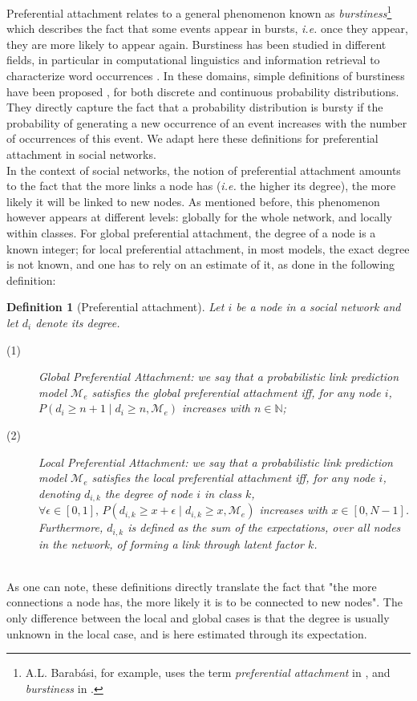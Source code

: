 \documentclass[journal]{IEEEtran}
\newcommand{\pr}{P}
\newtheorem{definition}{Definition}[section]
\begin{document}
Preferential attachment relates to a general phenomenon known as \textit{burstiness}\footnote{A.L. Barab\'asi, for example, uses the term \textit{preferential attachment} in \cite{barabasi1999emergence}, and \textit{burstiness} in \cite{barabasi_burst}.} which describes the fact that some events appear in bursts, \textit{i.e.} once they appear, they are more likely to appear again. Burstiness has been studied in different fields, in particular in computational linguistics and information retrieval to characterize word occurrences \cite{church1995poisson}. In these domains, simple definitions of burstiness have been proposed \cite{clinchant2008bnb,clinchant2010information}, for both discrete and continuous probability distributions. They directly capture the fact that a probability distribution is bursty if the probability of generating a new occurrence of an event increases with the number of occurrences of this event. We adapt here these definitions for preferential attachment in social networks.~\\

In the context of social networks, the notion of preferential attachment amounts to the fact that the more links a node has (\textit{i.e.} the higher its degree), the more likely it will be linked to new nodes. As mentioned before, this phenomenon however appears at different levels: globally for the whole network, and locally within classes. For global preferential attachment, the degree of a node is a known integer; for local preferential attachment, in most models, the exact degree is not known, and one has to rely on an estimate of it, as done in the following definition:~\\
%
\begin{definition}[Preferential attachment]
Let $i$ be a node in a social network and let $d_i$ denote its degree. 
\begin{description}
 \item[(1)] \emph{Global Preferential Attachment}: we say that a probabilistic link prediction model $\mathcal{M}_e$ satisfies the global preferential attachment iff, for any node $i$, $\pr(d_i \ge n+1 \mid d_i \ge n, \mathcal{M}_e)$ increases with $n \in \mathbb{N}$;
 \item[(2)] \emph{Local Preferential Attachment}: we say that a probabilistic link prediction model $\mathcal{M}_e$ satisfies the local preferential attachment iff, for any node $i$, denoting $d_{i,k}$ the degree of node $i$ in class $k$, $\forall \epsilon \in [0,1], \, \pr(d_{i,k} \ge x+\epsilon \mid d_{i,k} \ge x, \mathcal{M}_e)$ increases with $x \in [0,N-1]$. Furthermore, $d_{i,k}$ is defined as the sum of the expectations, over all nodes in the network, of forming a link through latent factor $k$.
\end{description}
\label{def:burst-soc-net}
\end{definition}~\\
%
%
As one can note, these definitions directly translate the fact that "the more connections a node has, the more likely it is to be connected to new nodes". The only difference between the local and global cases is that the degree is usually unknown in the local case, and is here estimated through its expectation.~\\
\end{document}
